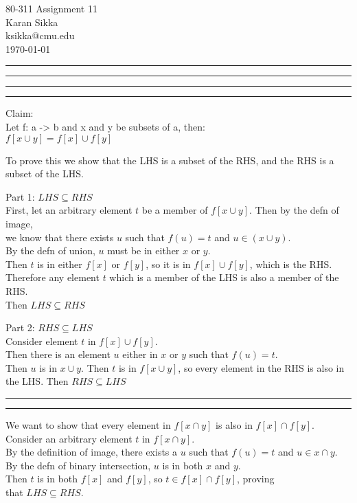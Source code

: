 \documentclass[11pt,letterpaper]{article}
\makeatletter
\newcommand{\question}[1] {\vspace{.25in} \hrule\vspace{0.5em}
\noindent{\bf #1} \vspace{0.5em}
\hrule \vspace{.10in}}
\newcommand{\myname}{Karan Sikka}
\newcommand{\myandrew}{ksikka@cmu.edu}
\newcommand{\myhwnum}{11}
\makeatother
\begin{document}
\medskip

\thispagestyle{plain}
\begin{center}                  %
{\Large 80-311 Assignment \myhwnum} \\
\myname \\
\myandrew \\
\today
\end{center}

\question{1}

\question{2.i}
Claim:\\
Let f: a -> b and x and y be subsets of a, then:\\
$f[x \cup y] = f[x] \cup f[y]$

To prove this we show that the LHS is a subset of the RHS, and the RHS is a subset of the LHS.

Part 1: $LHS \subseteq RHS$\\
First, let an arbitrary element $t$ be a member of $f[x \cup y]$. Then by the defn of image,\\
we know that there exists $u$ such that $f(u) = t$ and $u \in (x \cup y)$.\\
By the defn of union, $u$ must be in either $x$ or $y$.\\
Then $t$ is in either $f[x]$ or $f[y]$, so it is in $f[x] \cup f[y]$, which is the RHS.\\
Therefore any element $t$ which is a member of the LHS is also a member of the RHS.\\
Then $LHS \subseteq RHS$

Part 2: $RHS \subseteq LHS$\\
Consider element $t$ in $f[x] \cup f[y]$.\\
Then there is an element $u$ either in $x$ or $y$ such that $f(u) = t$.\\
Then $u$ is in $x \cup y$. Then $t$ is in $f[x \cup y]$, so every element in the RHS is also in the LHS.
Then $RHS \subseteq LHS$

\question{2.ii}
We want to show that every element in $f[x \cap y]$ is also in $f[x] \cap f[y]$.\\
Consider an arbitrary element $t$ in $f[x \cap y]$.\\
By the definition of image, there exists a $u$ such that $f(u) = t$ and $u \in x \cap y$.\\
By the defn of binary intersection, $u$ is in both $x$ and $y$.\\
Then $t$ is in both $f[x]$ and $f[y]$, so $t \in f[x] \cap f[y]$, proving\\
that $LHS \subseteq RHS$.\\
\end{document}
